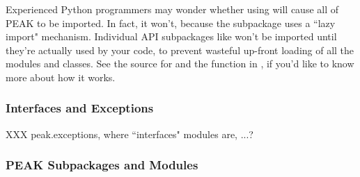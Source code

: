 \begin{notice}
Experienced Python programmers may wonder whether using
 will cause all of PEAK to be imported.  In
fact, it won't, because the  subpackage uses a 
``lazy import" mechanism.  Individual API subpackages like 
won't be imported until they're actually used by your code, to prevent wasteful
up-front loading of all the modules and classes.  See the source for
 and the  function in
, if you'd like to know more about how it works.
\end{notice} 



\subsubsection{Interfaces and Exceptions}

XXX peak.exceptions, where ``interfaces" modules are, ...?

\subsubsection{PEAK Subpackages and Modules}

